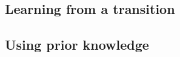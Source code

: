 \documentclass[../Master.tex]{subfiles}
\providecommand{\master}{..}
\begin{document}
\subsection{Learning from a transition}


\subsection{Using prior knowledge}

\end{document}
